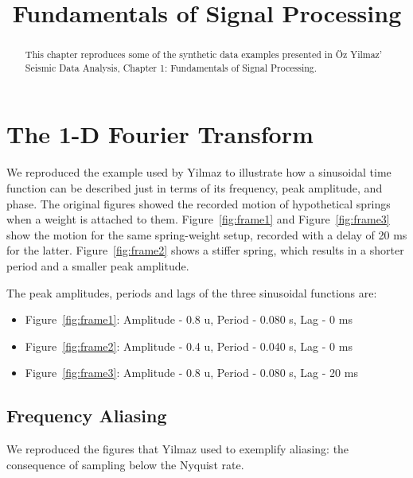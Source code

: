 \title{Fundamentals of Signal Processing}

\maketitle

\begin{abstract}
This chapter reproduces some of the synthetic data examples presented in {\"O}z Yilmaz' Seismic Data Analysis, Chapter 1: Fundamentals of Signal Processing.
\end{abstract}

\section{The 1-D Fourier Transform}

We reproduced the example used by Yilmaz to illustrate how a sinusoidal time function can be described just in terms of its frequency, peak amplitude, and phase. The original figures showed the recorded motion of hypothetical springs when a weight is attached to them. Figure~\ref{fig:frame1} and Figure~\ref{fig:frame3} show the motion for the same spring-weight setup, recorded with a delay of 20 ms for the latter. Figure~\ref{fig:frame2} shows a stiffer spring, which results in a shorter period and a smaller peak amplitude.

The peak amplitudes, periods and lags of the three sinusoidal functions are:
\begin{itemize}
    \item Figure~\ref{fig:frame1}: Amplitude - 0.8 u, Period - 0.080 s, Lag -  0 ms
    \item Figure~\ref{fig:frame2}: Amplitude - 0.4 u, Period - 0.040 s, Lag -  0 ms
    \item Figure~\ref{fig:frame3}: Amplitude - 0.8 u, Period - 0.080 s, Lag - 20 ms
\end{itemize}


\pagebreak

\subsection{Frequency Aliasing}

We reproduced the figures that Yilmaz used to exemplify aliasing: the consequence of sampling below the Nyquist rate.

